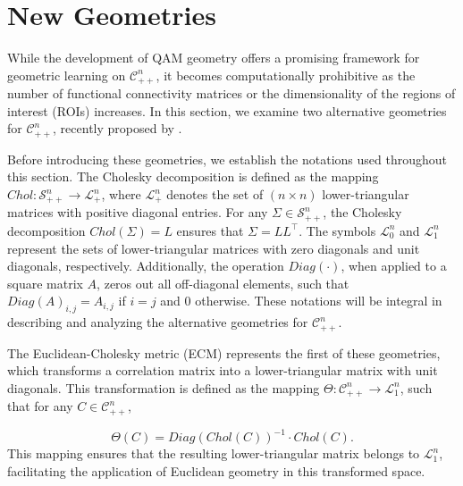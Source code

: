 \documentclass[10pt]{article}
\newcommand{\SPD}{\mathcal{S}_{++}^n}
\newcommand{\CORR}{\mathcal{C}_{++}^n}
\newcommand{\LTplus}{\mathcal{L}_{+}^n}
\newcommand{\LTones}{\mathcal{L}_1^n}
\newcommand{\LTzero}{\mathcal{L}_{0}^n}
\begin{document}
\section{New Geometries}\label{sec:geometries}

While the development of QAM geometry offers a promising framework for geometric learning on $\CORR$, it becomes computationally prohibitive as the number of functional connectivity matrices or the dimensionality of the regions of interest (ROIs) increases. In this section, we examine two alternative geometries for $\CORR$, recently proposed by \citet{thanwerdas_2022_TheoreticallyComputationallyConvenient}.

Before introducing these geometries, we establish the notations used throughout this section. The Cholesky decomposition is defined as the mapping $Chol: \SPD \rightarrow \LTplus$, where $\LTplus$ denotes the set of $(n \times n)$ lower-triangular matrices with positive diagonal entries. For any $\Sigma \in \SPD$, the Cholesky decomposition $Chol(\Sigma) = L$ ensures that $\Sigma = LL^\top$. The symbols $\LTzero$ and $\LTones$ represent the sets of lower-triangular matrices with zero diagonals and unit diagonals, respectively. Additionally, the operation $Diag(\cdot)$, when applied to a square matrix $A$, zeros out all off-diagonal elements, such that $Diag(A)_{i,j} = A_{i,j}$ if $i=j$ and $0$ otherwise. These notations will be integral in describing and analyzing the alternative geometries for $\CORR$.



The Euclidean-Cholesky metric (ECM) represents the first of these geometries, which transforms a correlation matrix into a lower-triangular matrix with unit diagonals. This transformation is defined as the mapping $\Theta: \CORR \rightarrow \LTones$, such that for any $C \in \CORR$, 

\begin{equation*} 
	\Theta(C) = Diag(Chol(C))^{-1} \cdot Chol(C). 
\end{equation*} This mapping ensures that the resulting lower-triangular matrix belongs to $\LTones$, facilitating the application of Euclidean geometry in this transformed space.
\end{document}
